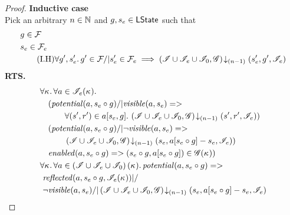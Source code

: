 \begin{lemma}
\begin{proof}
\noindent\textbf{Inductive case }\\
Pick an arbitrary $n \in \mathbb{N}$ and $g, s_e \in \textsf{LState}$ such that
%
\begin{align}
	& g \in  \mathcal{F}_{} \label{LEC:Ass1}\\
	& s_e \in \mathcal{F}_{e} \label{LEC:Ass2}\\
	& \tag{I.H} \forall g', s_e'.\,  g' \in \mathcal{F}_{} /| s'_e \in \mathcal{F}_{e} \implies \left(\mathscr{I} \cup \mathscr{I}_{e} \cup \mathscr{I}_0, \mathscr{G}\right) \!\downarrow_{(n-1)} \left(s_e', g', \mathscr{I}_{e}\right) \label{LEC:IH}
\end{align}
%
\textbf{RTS.}
%
\begin{align}
	& 
	\V{\ca{}}  \V{a\in \lmod_e(\ca{})} \nonumber \\
  &\quad (\m{potential}(a, s_e \composeL g) /| \m{visible}(a, s_e) => \nonumber\\
  & \quad\qquad\for{(s', r') \in a[s_e, g]} \extendsAMUpto{\lmod \cup \lmod_e \cup \lmod_0, \gmod}{(n-1)}{s'}{r'}{\lmod_e}) \label{LEC:Goal0}\\
% 
	&\quad (\m{potential}(a, s_e \composeL g) /| \neg\m{visible}(a, s_e) => \nonumber\\
  & \quad\qquad \extendsAMUpto{\lmod \cup \lmod_e \cup \lmod_0, \gmod}{(n-1)}{s_e}{a[s_e \composeL g] - s_e}{\lmod_e}) \label{LEC:Goal1}\\
%   
  &\quad \m{enabled}(a,s_e \composeL g)
  => (s_e \composeL g, a[s_e \composeL g])\in \gmod(\ca{})) \label{LEC:Goal2}\\
%  
  &\V{\ca{}}\V{a\in \left(\lmod \cup \lmod_e \cup \lmod_0 \right) (\ca{})}
  \m{potential}(a,s_e \composeL g) =>\null \nonumber \\
  &\ \m{reflected}(a, s_e \composeL g,\lmod_e(\ca{})) |/\null \nonumber \\
%  
  &\ \neg\m{visible}(a, s_e) /| \extendsAMUpto{\lmod \cup \lmod_e \cup \lmod_0, \gmod}{(n-1)}{s_e}{a[s_e \composeL g] - s_e}{\lmod_e}  \label{LEC:Goal3}
\end{align}
%
%


\end{proof}
\end{lemma}

